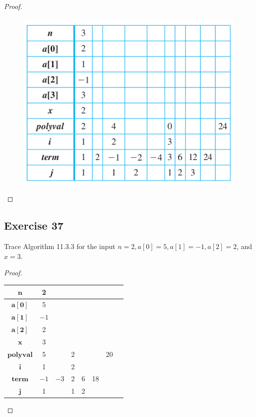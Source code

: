 \documentclass[14pt]{extarticle}
\begin{document}
\begin{proof}
    \begin{figure}[ht!]
        \centering
        \includegraphics[scale=0.6]{../images/11.3.36.png}
    \end{figure}
\end{proof}

\subsection{Exercise 37}
Trace Algorithm 11.3.3 for the input \(n = 2, a[0] = 5, a[1] = -1, a[2] = 2\), and \(x = 3\).

\begin{proof}
    \begin{center}
        \begin{tabular}{|c|c|c|c|c|c|c|c|}
            \hline
            \(\bm{n}\)       & 2    &      &   &   &    &    \\
            \hline
            \(\bm{a[0]}\)    & 5    &      &   &   &    &    \\
            \hline
            \(\bm{a[1]}\)    & $-1$ &      &   &   &    &    \\
            \hline
            \(\bm{a[2]}\)    & 2    &      &   &   &    &    \\
            \hline
            \(\bm{x}\)       & 3    &      &   &   &    &    \\
            \hline
            \(\bm{polyval}\) & 5    &      & 2 &   &    & 20 \\
            \hline
            \(\bm{i}\)       & 1    &      & 2 &   &    &    \\
            \hline
            \(\bm{term}\)    & $-1$ & $-3$ & 2 & 6 & 18 &    \\
            \hline
            \(\bm{j}\)       & 1    &      & 1 & 2 &    &    \\
            \hline
        \end{tabular}
    \end{center}
\end{proof}
\end{document}

